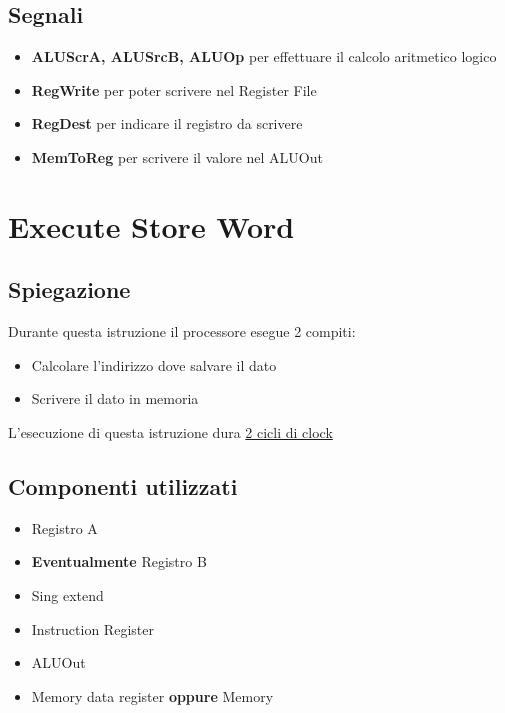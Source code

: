\subsection{Segnali}
\begin{itemize}
    \item \textbf{ALUScrA, ALUSrcB, ALUOp} per effettuare il calcolo aritmetico logico
    \item \textbf{RegWrite} per poter scrivere nel Register File
    \item \textbf{RegDest} per indicare il registro da scrivere
    \item \textbf{MemToReg} per scrivere il valore nel ALUOut
\end{itemize}

\newpage

\section{Execute Store Word}

\subsection{Spiegazione}
Durante questa istruzione il processore esegue 2 compiti:
\begin{itemize}
    \item Calcolare l'indirizzo dove salvare il dato
    \item Scrivere il dato in memoria
\end{itemize}

L'esecuzione di questa istruzione dura \uline{2 cicli di clock}

\subsection{Componenti utilizzati}
\begin{itemize}
    \item Registro A
    \item \textbf{Eventualmente} Registro B
    \item Sing extend
    \item Instruction Register
    \item ALUOut
    \item Memory data register \textbf{oppure} Memory
\end{itemize}

